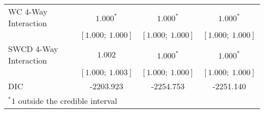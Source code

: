 \begin{table}
\begin{center}
\begin{tabular}{l c c c }
WC 4-Way Interaction   & $1.000^{*}$       & $1.000^{*}$       & $1.000^{*}$       \\
                       & $[1.000;\ 1.000]$ & $[1.000;\ 1.000]$ & $[1.000;\ 1.000]$ \\
SWCD 4-Way Interaction & $1.002$           & $1.000^{*}$       & $1.000^{*}$       \\
                       & $[1.000;\ 1.003]$ & $[1.000;\ 1.000]$ & $[1.000;\ 1.000]$ \\
\hline
DIC                    & -2203.923         & -2254.753         & -2251.140         \\
\hline
\multicolumn{4}{l}{\scriptsize{$^* 1$ outside the credible interval}}
\end{tabular}
\label{table:typefunding}
\end{center}
\end{table}
